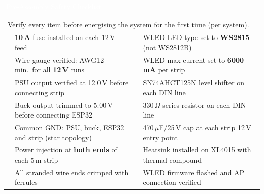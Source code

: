 \documentclass[10pt, a4paper]{article}
\renewcommand{\section}[1]{%
  \vspace{10pt}%
  \noindent%
  \colorbox{hmed}{%
    \parbox{\dimexpr\linewidth-2\fboxsep\relax}{%
      \textcolor{white}{\large\bfseries\strut\enspace#1\strut}%
    }%
  }%
  \par\vspace{6pt}\noindent%
}
\newcommand{\cbox}{\makebox[0.5cm][c]{$\square$}}
\begin{document}
\vspace{6pt}

\section{5.\enspace Pre-Assembly Safety Checklist}

\begin{tabularx}{\linewidth}{c X c X}
  \multicolumn{4}{l}{%
    \small\color{grayfg}
    Verify every item before energising the system for the first time (per system).}
  \\[4pt]

  \rowcolor{rowB}
  \cbox & \small \textbf{10\,A} fuse installed on each 12\,V feed
  & \cbox & \small WLED LED type set to \textbf{WS2815} (not WS2812B) \\

  \cbox & \small Wire gauge verified: AWG12 min.\ for all \textbf{12\,V} runs
  & \cbox & \small WLED max current set to \textbf{6000\,mA} per strip \\

  \rowcolor{rowB}
  \cbox & \small PSU output verified at 12.0\,V before connecting strip
  & \cbox & \small SN74AHCT125N level shifter on each DIN line \\

  \cbox & \small Buck output trimmed to 5.00\,V before connecting ESP32
  & \cbox & \small 330\,$\Omega$ series resistor on each DIN line \\

  \rowcolor{rowB}
  \cbox & \small Common GND: PSU, buck, ESP32 and strip (star topology)
  & \cbox & \small 470\,$\mu$F/25\,V cap at each strip 12\,V entry point \\

  \cbox & \small Power injection at \textbf{both ends} of each 5\,m strip
  & \cbox & \small Heatsink installed on XL4015 with thermal compound \\

  \rowcolor{rowB}
  \cbox & \small All stranded wire ends crimped with ferrules
  & \cbox & \small WLED firmware flashed and AP connection verified \\

  \bottomrule
\end{tabularx}
\end{document}
